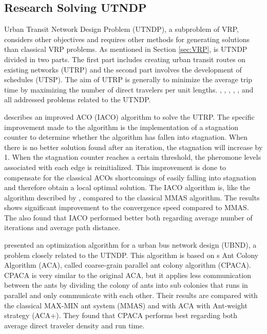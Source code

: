 \subsection{Research Solving UTNDP}

Urban Transit Network Design Problem (UTNDP), a subproblem of VRP, considers other objectives and requires other methods for generating solutions than classical VRP problems. As mentioned in Section \vref{sec:VRP}, is UTNDP divided in two parts. The first part includes creating urban transit routes on existing networks (UTRP) and the second part involves the development of schedules (UTSP). The aim of UTRP is generally to minimize the average trip time by maximizing the number of direct travelers per unit lengths. \citet{yang07}, \citet{salehinejad10}, \citet{jiang10}, \citet{poorzahedy11}, \citet{nikolic14}, and \citet{kechagiopoulos14} all addressed problems related to the UTNDP.

\citet{jiang10} describes an improved ACO (IACO) algorithm to solve the UTRP. The specific improvement made to the algorithm is the implementation of a stagnation counter to determine whether the algorithm has fallen into stagnation. When there is no better solution found after an iteration, the stagnation will increase by 1. When the stagnation counter reaches a certain threshold, the pheromone levels associated with each edge is reinitialized. This improvement is done to compensate for the classical ACOs shortcomings of easily falling into stagnation and therefore obtain a local optimal solution. The IACO algorithm is, like the algorithm described by \citet{yang07}, compared to the classical MMAS algorithm. The results shows significant improvement to the convergence speed compared to MMAS. The also found that IACO performed better both regarding average number of iterations and average path distance. 

\citet{yang07} presented an optimization algorithm for a urban bus network design (UBND), a problem closely related to the UTNDP. This algorithm is based on \citet{dorigo96}s Ant Colony Algorithm (ACA), called coarse-grain parallel ant colony algorithm (CPACA). CPACA is very similar to the original ACA, but it applies less communication between the ants by dividing the colony of ants into sub colonies that runs in parallel and only communicate with each other. Their results are compared with the classical MAX-MIN ant system (MMAS)\citep{stutzle99} and with ACA with Ant-weight strategy (ACA+). They found that CPACA performs best regarding both average direct traveler density and run time. 

